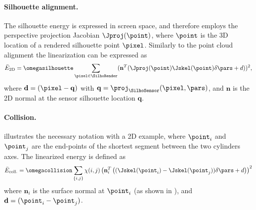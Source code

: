 \paragraph*{Silhouette alignment.} The silhouette energy is expressed in screen space, and therefore employs the perspective projection Jacobian $\Jproj(\point)$, where $\point$ is the 3D location of a rendered silhouette point $\pixel$. Similarly to the point cloud alignment the linearization can be expressed as
\begin{equation*}
\bar{E}_{\text{2D}} = \omegasilhouette \sum_{\pixel \in \SilhoRender} (\mathbf{n}^T(\Jproj(\point) \Jskel(\point) \delta\pars + d))^2,
\end{equation*}
where $\mathbf{d} = (\pixel - \mathbf{q})$ with $\mathbf{q} = \proj_{\SilhoSensor} (\pixel,\pars)$, and $\mathbf{n}$ is the 2D normal at the sensor silhouette location $\mathbf{q}$.
% 
% 
%  
% 
%

\paragraph*{Collision.}  illustrates the necessary notation with a 2D example, where $\point_i$ and $\point_j$ are the end-points of the shortest segment between the two cylinders axes. The linearized energy is defined as
% 
\begin{equation*}
\bar{E}_{\text{coll.}} = \omegacollision \sum_{\{i,j\}} \chi(i,j)\left(\mathbf{n}_i^T\left((\Jskel(\point_i) - \Jskel(\point_j)) \delta\pars + d\right)\right)^2
\end{equation*}
%
where $\mathbf{n}_i$ is the surface normal at $\point_i$ (as shown in ), and $\mathbf{d} = (\point_i - \point_j)$. 
%  
% 
%  

\vspace{-.15in}
